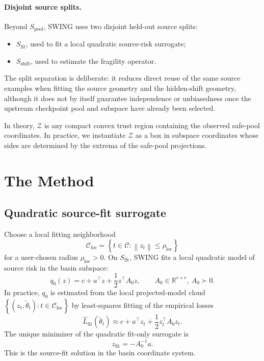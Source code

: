 \documentclass{article}
\newcommand{\RR}{\mathbb{R}}
\newcommand{\cC}{\mathcal{C}}
\newcommand{\cZ}{\mathcal{Z}}
\newcommand{\swing}{\textup{\textsc{SWING}}}
\newcommand{\norm}[1]{\left\lVert #1 \right\rVert}
\newcommand{\braces}[1]{\left\{ #1 \right\}}
\begin{document}
\paragraph{Disjoint source splits.}
Beyond \(S_{\mathrm{pool}}\), \swing{} uses two disjoint held-out source splits:
\begin{itemize}[leftmargin=1.4em]
    \item \(S_{\mathrm{fit}}\), used to fit a local quadratic source-risk surrogate;
    \item \(S_{\mathrm{shift}}\), used to estimate the fragility operator.
\end{itemize}
The split separation is deliberate: it reduces direct reuse of the same source examples when fitting the source geometry and the hidden-shift geometry, although it does not by itself guarantee independence or unbiasedness once the upstream checkpoint pool and subspace have already been selected.

In theory, \(\cZ\) is any compact convex trust region containing the observed safe-pool coordinates. In practice, we instantiate \(\cZ\) as a box in subspace coordinates whose sides are determined by the extrema of the safe-pool projections.

\section{The Method}
\label{sec:method}

\subsection{Quadratic source-fit surrogate}

Choose a local fitting neighborhood
\[
\cC_{\mathrm{loc}}
=
\braces{t\in\cC : \norm{z_t}\le \rho_{\mathrm{loc}}}
\]
for a user-chosen radius \(\rho_{\mathrm{loc}}>0\). On \(S_{\mathrm{fit}}\), \swing{} fits a local quadratic model of source risk in the basin subspace:
\[
q_0(z) = c + a^\top z + \frac{1}{2} z^\top A_0 z,
\qquad
A_0 \in \RR^{r\times r}, \ A_0 \succ 0.
\]
In practice, \(q_0\) is estimated from the local projected-model cloud \(\braces{(z_t,\tilde\theta_t) : t\in\cC_{\mathrm{loc}}}\) by least-squares fitting of the empirical losses
\[
\widehat L_{\mathrm{fit}}(\tilde\theta_t)
\approx
c + a^\top z_t + \frac{1}{2} z_t^\top A_0 z_t.
\]
The unique minimizer of the quadratic fit-only surrogate is
\[
z_{\mathrm{fit}} = -A_0^{-1}a.
\]
This is the source-fit solution in the basin coordinate system.
\end{document}
